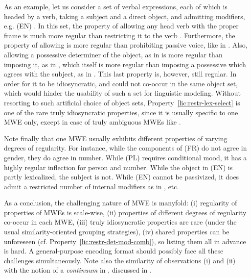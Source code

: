 \documentclass[output=paper]{langsci/langscibook}
\begin{document}
As an example, let us consider a set of  verbal expressions, each of which is headed by a verb, taking a subject and a direct object, and admitting modifiers, e.g. (EN) . In this set, the property of allowing any head verb with the proper  frame is much more regular than restricting it to the verb . Furthermore, the property of allowing  is more regular than prohibiting passive voice, like in . Also, allowing a possessive determiner of the object, as in  is more regular than imposing it, as in , which itself is more regular than imposing a possessive which agrees with the subject, as in . This last property is, however, still regular. In order for it to be idiosyncratic,  and  could not co-occur in the same object set, which would hinder the usability of such a set for linguistic modeling. Without resorting to such artificial choice of object sets, Property~\ref{lic:restr-lex-select} is one of the rare truly idiosyncratic properties, since it is usually specific to one MWE only, except in case of truly ambiguous MWEs like .

Note finally that one MWE usually exhibits different properties of varying degrees of regularity. For instance, while the components of (FR)  do not agree in gender, they do agree in number. While (PL)  requires conditional mood, it has a highly regular inflection for person and number. While the object in (EN)  is partly lexicalized, the subject is not. While (EN)  cannot be passivized, it does admit a restricted number of internal modifiers as in , etc.

As a conclusion, the challenging nature of MWE is manyfold: (i) regularity of properties of MWEs is scale-wise, (ii) properties of different degrees of regularity co-occur in each MWE, (iii) truly idiosyncratic properties are rare (under the usual similarity-oriented grouping strategies), (iv) shared properties can be unforeseen (cf. Property~\ref{lic:restr-det-mod-comb}), so listing them all in advance is hard. A general-purpose encoding format should possibly face all these challenges simultaneously. Note also the similarity of observations (i) and (ii) with the notion of a \emph{ continuum} in , discussed in .
\end{document}
